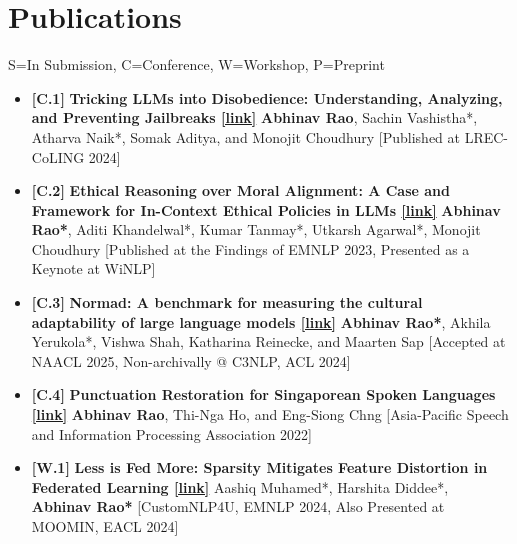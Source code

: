 \documentclass[11pt,letterpaper]{article}
\begin{document}
    \section*{Publications}
    \small{S=In Submission, C=Conference, W=Workshop, P=Preprint}
    
    \begin{itemize}[leftmargin=*,label={},itemsep=4pt]
        \item {\color{maincolor}\textbf{[C.1]}} \textbf{Tricking LLMs into Disobedience: Understanding, Analyzing,
                and Preventing Jailbreaks \href{https://aclanthology.org/2024.lrec-main.1462/}{[link]}}  \textbf{Abhinav Rao}, Sachin Vashistha*, Atharva Naik*, Somak Aditya, and Monojit Choudhury
            [Published at LREC-CoLING 2024]
        
           
        \item {\color{maincolor}\textbf{[C.2]}} \textbf{Ethical Reasoning over Moral Alignment: A Case and
                Framework for In-Context Ethical Policies in LLMs \href{https://aclanthology.org/2023.findings-emnlp.892/}{[link]}}  \textbf{Abhinav Rao*}, Aditi Khandelwal*, Kumar Tanmay*, Utkarsh Agarwal*, Monojit Choudhury
            [Published at the Findings of EMNLP 2023, Presented as a Keynote at WiNLP]
        
           
        \item {\color{maincolor}\textbf{[C.3]}} \textbf{Normad: A benchmark for measuring the cultural
                adaptability of large language models \href{https://arxiv.org/abs/2404.12464}{[link]}}  \textbf{Abhinav Rao*}, Akhila Yerukola*, Vishwa Shah, Katharina Reinecke, and Maarten Sap
            [Accepted at NAACL 2025, Non-archivally @ C3NLP, ACL 2024]
        
           
        \item {\color{maincolor}\textbf{[C.4]}} \textbf{Punctuation Restoration for Singaporean Spoken
                Languages \href{https://arxiv.org/abs/2212.05356}{[link]}}  \textbf{Abhinav Rao}, Thi-Nga Ho, and Eng-Siong Chng
            [Asia-Pacific Speech and Information Processing Association 2022]
        
           
        \item {\color{maincolor}\textbf{[W.1]}} \textbf{Less is Fed More: Sparsity Mitigates Feature Distortion in
                Federated Learning \href{https://aclanthology.org/2024.customnlp4u-1.4/}{[link]}}  Aashiq Muhamed*, Harshita Diddee*, \textbf{Abhinav Rao*}
            [CustomNLP4U, EMNLP 2024, Also Presented at MOOMIN, EACL 2024]
        

\end{itemize}
\end{document}
